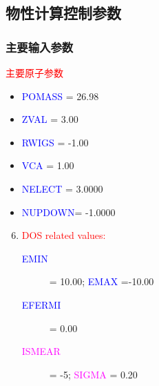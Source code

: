 \documentclass[cjk,slidestop,compress,mathserif,blue]{beamer}
\begin{document}
\subsection{物性计算控制参数}
\frame
{
\frametitle{主要输入参数}
\textcolor{red}{主要原子参数}
\begin{itemize}
	\item \textcolor{blue}{POMASS} =  26.98~~\textcolor{brown}{\fontsize{9.2pt}{3.9pt}\selectfont{Mass of Ions in am}}\\

	\item \textcolor{blue}{ZVAL}   =   3.00~~\textcolor{brown}{\fontsize{9.2pt}{3.9pt}\selectfont{Ionic Valenz}}\\

	\item \textcolor{blue}{RWIGS}  =  -1.00~~\textcolor{brown}{\fontsize{9.2pt}{3.9pt}\selectfont{Atomic Wigner-Seitz radii}}\\
		
	\item \textcolor{blue}{VCA}    =   1.00~~\textcolor{brown}{\fontsize{9.2pt}{3.9pt}\selectfont{virtual crystal weights}}\\
   
	\item \textcolor{blue}{NELECT} =       3.0000 ~~\textcolor{brown}{\fontsize{9.2pt}{3.9pt}\selectfont{total number of electrons}}\\

	\item \textcolor{blue}{NUPDOWN}=      -1.0000 ~~\textcolor{brown}{\fontsize{9.2pt}{3.9pt}\selectfont{fix difference up-down}}
\end{itemize}

\begin{enumerate}
\setcounter{enumi}{5}
\item \textcolor{red}{\textrm{DOS related values:}}
	\begin{description}
		\item[\textcolor{blue}{EMIN}]=  10.00;   \textcolor{blue}{EMAX}   =-10.00~~\textcolor{brown}{\fontsize{9.2pt}{3.9pt}\selectfont{energy-range for DOS}}
		\item[\textcolor{blue}{EFERMI}] =   0.00
		\item[\textcolor{magenta}{ISMEAR}] =    -5;   \textcolor{magenta}{SIGMA}  =   0.20~~\textcolor{blue}{\fontsize{9.2pt}{3.9pt}}
	\end{description}
\end{enumerate}
   }
\end{document}

